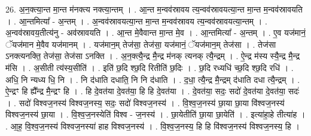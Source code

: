 \documentclass[17pt]{extarticle}
\begin{document}
26. अ॒न॒क्त्या॒न्त मा॒न्त म॑नक्त्य नक्त्या॒न्तम् । . आ॒न्त म॒न्वव॑स्रावय त्य॒न्वव॑स्रावयत्या॒न्त मा॒न्त म॒न्वव॑स्रावयति । . आ॒न्तमित्या᳚ - अ॒न्तम् । . अ॒न्वव॑स्रावयत्या॒न्त मा॒न्त म॒न्वव॑स्रावय त्य॒न्वव॑स्रावयत्या॒न्तम् । . अ॒न्वव॑स्रावय॒तीत्य॑नु - अव॑स्रावयति । . आ॒न्त मे॒वैवान्त मा॒न्त मे॒व । . आ॒न्तमित्या᳚ - अ॒न्तम् । . ए॒व यज॑मानं॒ ॅयज॑मान मे॒वैव यज॑मानम् । . यज॑मान॒म् तेज॑सा॒ तेज॑सा॒ यज॑मानं॒ ॅयज॑मान॒म् तेज॑सा । . तेज॑सा ऽनक्त्यनक्ति॒ तेज॑सा॒ तेज॑सा ऽनक्ति । . अ॒न॒क्त्यै॒न्द्र मै॒न्द्र म॑नक् त्यनक् त्यै॒न्द्रम् । . ऐ॒न्द्र म॑स्य स्यै॒न्द्र मै॒न्द्र म॑सि । . अ॒सीती त्य॑स्य॒सीति॑ । . इति॑ छ॒दि श्छ॒दि रितीति॑ छ॒दिः । . छ॒दि रध्यधि॑ च्छ॒दि श्छ॒दि रधि॑ । . अधि॒ नि न्यध्य धि॒ नि । . नि द॑धाति दधाति॒ नि नि द॑धाति । . द॒धा॒ त्यै॒न्द्र मै॒न्द्रम् द॑धाति दधा त्यै॒न्द्रम् । . ऐ॒न्द्रꣳ हि ह्यै᳚न्द्र मै॒न्द्रꣳ हि । . हि दे॒वत॑या दे॒वत॑या॒ हि हि दे॒वत॑या । . दे॒वत॑या॒ सदः॒ सदो॑ दे॒वत॑या दे॒वत॑या॒ सदः॑ । . सदो॑ विश्वज॒नस्य॑ विश्वज॒नस्य॒ सदः॒ सदो॑ विश्वज॒नस्य॑ । . वि॒श्व॒ज॒नस्य॑ छा॒या छा॒या वि॑श्वज॒नस्य॑ विश्वज॒नस्य॑ छा॒या । . वि॒श्व॒ज॒नस्येति॑ विश्व - ज॒नस्य॑ । . छा॒येतीति॑ छा॒या छा॒येति॑ । . इत्या॑हा॒हे तीत्या॑ह । . आ॒ह॒ वि॒श्व॒ज॒नस्य॑ विश्वज॒नस्या॑ हाह विश्वज॒नस्य॑ । . वि॒श्व॒ज॒नस्य॒ हि हि वि॑श्वज॒नस्य॑ विश्वज॒नस्य॒ हि । \newline
\end{document}
